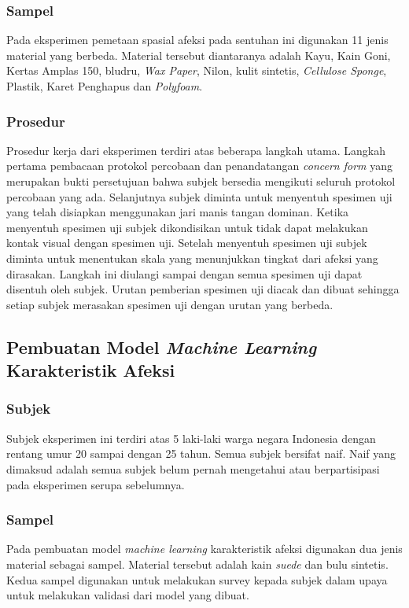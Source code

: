 \documentclass{Jurnal_kolo}
\begin{document}
\begin{multicols}{2}
	\subsubsection{Sampel}
	\indent Pada eksperimen pemetaan spasial afeksi pada sentuhan ini digunakan 11 jenis material yang berbeda. Material tersebut diantaranya adalah Kayu, Kain Goni, Kertas Amplas 150, bludru, \emph{Wax Paper}, Nilon, kulit sintetis, \emph{Cellulose Sponge}, Plastik, Karet Penghapus dan \emph{Polyfoam}.
	
	\subsubsection{Prosedur}
	\indent Prosedur kerja dari eksperimen terdiri atas beberapa langkah utama. Langkah pertama pembacaan protokol percobaan dan penandatangan \emph{concern form} yang merupakan bukti persetujuan bahwa subjek bersedia mengikuti seluruh protokol percobaan yang ada. Selanjutnya subjek diminta untuk menyentuh spesimen uji yang telah disiapkan menggunakan jari manis tangan dominan. Ketika menyentuh spesimen uji subjek dikondisikan untuk tidak dapat melakukan kontak visual dengan spesimen uji. Setelah menyentuh spesimen uji subjek diminta untuk menentukan skala yang menunjukkan tingkat dari afeksi yang dirasakan. Langkah ini diulangi sampai dengan semua spesimen uji dapat disentuh oleh subjek. Urutan pemberian spesimen uji diacak dan dibuat sehingga setiap subjek merasakan spesimen uji dengan urutan yang berbeda.
	
	\subsection{Pembuatan Model \emph{Machine Learning} Karakteristik Afeksi}
	\subsubsection{Subjek}
	\indent Subjek eksperimen ini terdiri atas 5 laki-laki warga negara Indonesia dengan rentang umur 20 sampai dengan 25 tahun. Semua subjek bersifat naif. Naif yang dimaksud adalah semua subjek belum pernah mengetahui atau berpartisipasi pada eksperimen serupa sebelumnya.
	
	\subsubsection{Sampel}
	\indent Pada pembuatan model \emph{machine learning} karakteristik afeksi digunakan dua jenis material sebagai sampel. Material tersebut adalah kain \emph{suede} dan bulu sintetis. Kedua sampel digunakan untuk melakukan survey kepada subjek dalam upaya untuk melakukan validasi dari model yang dibuat.
	

\end{multicols}
\end{document}
